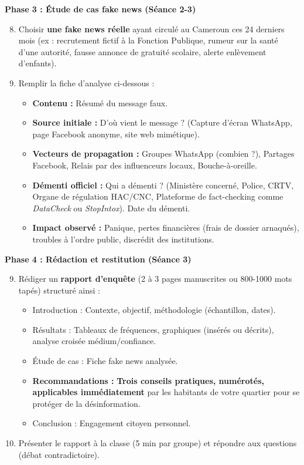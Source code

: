 \documentclass[11pt]{article}
\newcommand{\cle}[1]{{\popxbold\color{popdark}#1}}
\begin{document}
\textbf{Phase 3 : Étude de cas \cle{fake news} (Séance 2-3)}
\begin{enumerate}
    \setcounter{enumi}{7}
    \item Choisir \textbf{une fake news réelle} ayant circulé au Cameroun ces 24 derniers mois (ex : recrutement fictif à la Fonction Publique, rumeur sur la santé d'une autorité, fausse annonce de gratuité scolaire, alerte enlèvement d'enfants).
    \item Remplir la fiche d'analyse ci-dessous :
    \begin{itemize}
        \item \textbf{Contenu :} Résumé du message faux.
        \item \textbf{Source initiale :} D'où vient le message ? (Capture d'écran WhatsApp, page Facebook anonyme, site web mimétique).
        \item \textbf{Vecteurs de propagation :} Groupes WhatsApp (combien ?), Partages Facebook, Relais par des influenceurs locaux, Bouche-à-oreille.
        \item \textbf{Démenti officiel :} Qui a démenti ? (Ministère concerné, Police, CRTV, Organe de régulation \cle{HAC}/\cle{CNC}, Plateforme de fact-checking comme \emph{DataCheck} ou \emph{StopIntox}). Date du démenti.
        \item \textbf{Impact observé :} Panique, pertes financières (frais de dossier arnaqués), troubles à l'ordre public, discrédit des institutions.
    \end{itemize}
\end{enumerate}

\textbf{Phase 4 : Rédaction et restitution (Séance 3)}
\begin{enumerate}
    \setcounter{enumi}{8}
    \item Rédiger un \textbf{rapport d'enquête} (2 à 3 pages manuscrites ou 800-1000 mots tapés) structuré ainsi :
    \begin{itemize}
        \item Introduction : Contexte, objectif, méthodologie (échantillon, dates).
        \item Résultats : Tableaux de fréquences, graphiques (insérés ou décrits), analyse croisée médium/confiance.
        \item Étude de cas : Fiche fake news analysée.
        \item \textbf{Recommandations :} \textbf{Trois conseils pratiques, numérotés, applicables immédiatement} par les habitants de votre quartier pour se protéger de la désinformation.
        \item Conclusion : Engagement citoyen personnel.
    \end{itemize}
    \item Présenter le rapport à la classe (5 min par groupe) et répondre aux questions (débat contradictoire).
\end{enumerate}
\end{document}
